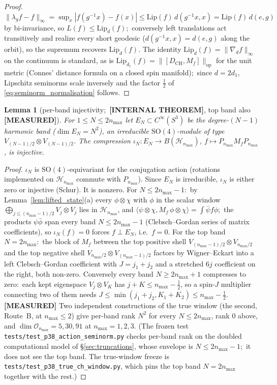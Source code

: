 \documentclass[11pt,a4paper]{article}
\theoremstyle{plain}
\newtheorem{lemma}[theorem]{Lemma}
\theoremstyle{definition}
\newcommand{\nmax}{n_{\max}}
\newcommand{\sthree}{S^{3}}
\newcommand{\Hilb}{\mathcal{H}}
\newcommand{\Op}{\mathcal{O}}
\newcommand{\opnorm}[1]{\lVert #1 \rVert_{\mathrm{op}}}
\newcommand{\norm}[1]{\lVert #1 \rVert}
\newcommand{\DCH}{D_{\mathrm{CH}}}
\begin{document}
\begin{proof}
$\norm{\lambda_g f - f}_\infty = \sup_x |f(g^{-1}x) - f(x)| \le
\mathrm{Lip}(f)\, d(g^{-1}x, x) = \mathrm{Lip}(f)\, d(e, g)$ by
bi-invariance, so $L(f) \le \mathrm{Lip}_d(f)$;\ conversely left
translations act transitively and realize every short geodesic
($d(g^{-1}x, x) = d(e, g)$ along the orbit), so the supremum
recovers $\mathrm{Lip}_d(f)$. The identity $\mathrm{Lip}_d(f) =
\norm{\nabla_d f}_\infty$ on the continuum is standard, as is
$\mathrm{Lip}_{d_1}(f) = \opnorm{[\DCH, M_f]}$ for the unit metric
(Connes' distance formula on a closed spin manifold);\ since
$d = 2 d_1$, Lipschitz seminorms scale inversely and the factor
$\tfrac12$ of \eqref{eq:seminorm_normalisation} follows.
\end{proof}

\begin{lemma}[per-band injectivity;\ \textbf{[INTERNAL THEOREM]}, top band also \textbf{[MEASURED]}]\label{lem:band_injectivity}
For $1 \le N \le 2\nmax$ let $E_N \subset C^\infty(\sthree)$ be
the degree-$(N{-}1)$ harmonic band ($\dim E_N = N^2$), an irreducible
$\mathrm{SO}(4)$-module of type $V_{(N-1)/2} \otimes V_{(N-1)/2}$.
The compression $\iota_N : E_N \to B(\Hilb_{\nmax})$,
$f \mapsto P_{\nmax} M_f P_{\nmax}$, is injective.
\end{lemma}

\begin{proof}
$\iota_N$ is $\mathrm{SO}(4)$-equivariant for the conjugation action
(rotations implemented on $\Hilb_{\nmax}$ commute with $P_{\nmax}$).
Since $E_N$ is irreducible, $\iota_N$ is either zero or injective
(Schur). It is nonzero. For $N \le 2\nmax - 1$:\ by
Lemma~\ref{lem:lifted_state}(a) every $\phi \otimes \chi$ with $\phi$ in
the scalar window $\bigoplus_{j \le (\nmax-1)/2} V_j \otimes V_j$ lies in
$\Hilb_{\nmax}$, and $\langle \psi \otimes \chi, M_f\, \phi \otimes
\chi\rangle = \int \bar\psi f \phi$;\ the products $\psi\bar\phi$ span
every band $N \le 2\nmax - 1$ (Clebsch--Gordan series of matrix
coefficients), so $\iota_N(f) = 0$ forces $f \perp E_N$, i.e.\ $f = 0$.
For the top band $N = 2\nmax$:\ the block of $M_f$ between the top
positive shell $V_{(\nmax-1)/2} \otimes V_{\nmax/2}$ and the top negative
shell $V_{\nmax/2} \otimes V_{(\nmax-1)/2}$ factors by Wigner--Eckart
into a left Clebsch--Gordan coefficient with $J = j_1 + j_2$ and a
stretched $6j$ coefficient on the right, both non-zero.
Conversely every band $N \ge 2\nmax + 1$ compresses to zero:\ each kept
eigenspace $V_j \otimes V_K$ has $j + K \le \nmax - \tfrac12$, so a
spin-$J$ multiplier connecting two of them needs $J \le \min(j_1 + j_2,
K_1 + K_2) \le \nmax - \tfrac12$. \textbf{[MEASURED]} Two independent
constructions of the true window (the second, Route~B,
at $\nmax \le 2$) give per-band rank $N^2$
for every $N \le 2\nmax$, rank $0$ above, and $\dim \Op_{\nmax} = 5, 30,
91$ at $\nmax = 1, 2, 3$. (The frozen test
\texttt{tests/test\_p38\_action\_seminorm.py} checks per-band rank on the
doubled computational model of \S\ref{sec:truncations}, whose envelope
is $N \le 2\nmax - 1$;\ it does not see the top band. The true-window
freeze is \texttt{tests/test\_p38\_true\_ch\_window.py}, which pins the
top band $N = 2\nmax$ together with the rest.)
\end{proof}
\end{document}
